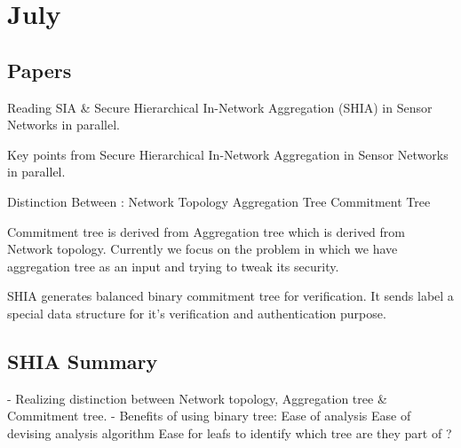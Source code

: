 \chapter{July}

	\section{Papers}

	Reading SIA & Secure Hierarchical In-Network Aggregation (SHIA) in Sensor Networks in parallel.

	Key points from Secure Hierarchical In-Network Aggregation in Sensor Networks in parallel.

		Distinction Between :
			Network Topology
			Aggregation Tree
			Commitment Tree 

			Commitment tree is derived from Aggregation tree which is derived from Network topology. Currently we focus on the problem in which we have aggregation tree as an input and trying to tweak its security. 

		SHIA generates balanced binary commitment tree for verification.
		It sends label a special data structure for it's verification and authentication purpose.


\section{SHIA Summary}

- Realizing distinction between Network topology, Aggregation tree & Commitment tree.
- Benefits of using binary tree:
	Ease of analysis
	Ease of devising analysis algorithm
	Ease for leafs to identify which tree are they part of ? 

